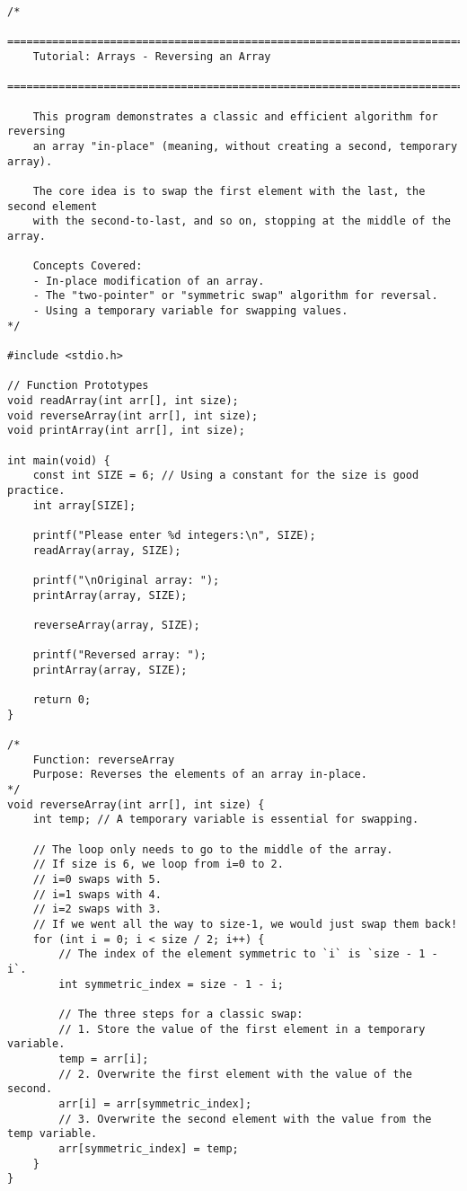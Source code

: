 \documentclass[11pt]{book}
\begin{document}
\begin{verbatim}
/*
    ================================================================================
    Tutorial: Arrays - Reversing an Array
    ================================================================================

    This program demonstrates a classic and efficient algorithm for reversing
    an array "in-place" (meaning, without creating a second, temporary array).

    The core idea is to swap the first element with the last, the second element
    with the second-to-last, and so on, stopping at the middle of the array.

    Concepts Covered:
    - In-place modification of an array.
    - The "two-pointer" or "symmetric swap" algorithm for reversal.
    - Using a temporary variable for swapping values.
*/

#include <stdio.h>

// Function Prototypes
void readArray(int arr[], int size);
void reverseArray(int arr[], int size);
void printArray(int arr[], int size);

int main(void) {
    const int SIZE = 6; // Using a constant for the size is good practice.
    int array[SIZE];

    printf("Please enter %d integers:\n", SIZE);
    readArray(array, SIZE);

    printf("\nOriginal array: ");
    printArray(array, SIZE);

    reverseArray(array, SIZE);

    printf("Reversed array: ");
    printArray(array, SIZE);

    return 0;
}

/*
    Function: reverseArray
    Purpose: Reverses the elements of an array in-place.
*/
void reverseArray(int arr[], int size) {
    int temp; // A temporary variable is essential for swapping.

    // The loop only needs to go to the middle of the array.
    // If size is 6, we loop from i=0 to 2.
    // i=0 swaps with 5.
    // i=1 swaps with 4.
    // i=2 swaps with 3.
    // If we went all the way to size-1, we would just swap them back!
    for (int i = 0; i < size / 2; i++) {
        // The index of the element symmetric to `i` is `size - 1 - i`.
        int symmetric_index = size - 1 - i;

        // The three steps for a classic swap:
        // 1. Store the value of the first element in a temporary variable.
        temp = arr[i];
        // 2. Overwrite the first element with the value of the second.
        arr[i] = arr[symmetric_index];
        // 3. Overwrite the second element with the value from the temp variable.
        arr[symmetric_index] = temp;
    }
}


\end{verbatim}
\end{document}
